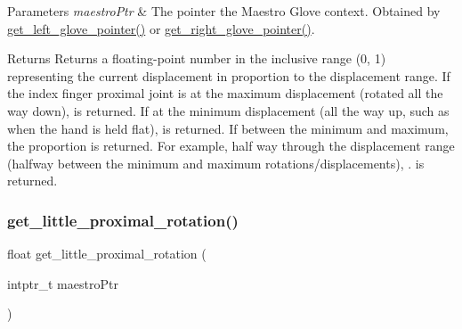 \begin{DoxyParams}{Parameters}
{\em maestro\+Ptr} & The pointer the Maestro Glove context. Obtained by \hyperlink{group__glove_management_ga63ce3c99d4a8b8db851b22af9185764e}{get\+\_\+left\+\_\+glove\+\_\+pointer()} or \hyperlink{group__glove_management_ga9b8fd9d91aeac3f8da50f7a7eba0c32b}{get\+\_\+right\+\_\+glove\+\_\+pointer()}. \\
\hline
\end{DoxyParams}
\begin{DoxyReturn}{Returns}
Returns a floating-\/point number in the inclusive range {\ttfamily (0, 1)} representing the current displacement in proportion to the displacement range. If the index finger proximal joint is at the maximum displacement (rotated all the way down), {} is returned. If at the minimum displacement (all the way up, such as when the hand is held flat), {} is returned. If between the minimum and maximum, the proportion is returned. For example, half way through the displacement range (halfway between the minimum and maximum rotations/displacements), {.} is returned. 
\end{DoxyReturn}
\mbox{\label{group__rotation_access_ga92c96531688ae5be50890e7883eccd05}} 
\subsubsection{\texorpdfstring{get\+\_\+little\+\_\+proximal\+\_\+rotation()}{get\_little\_proximal\_rotation()}}
{\footnotesize\ttfamily float get\+\_\+little\+\_\+proximal\+\_\+rotation (\begin{DoxyParamCaption}\item[{intptr\+\_\+t}]{maestro\+Ptr }\end{DoxyParamCaption})}


